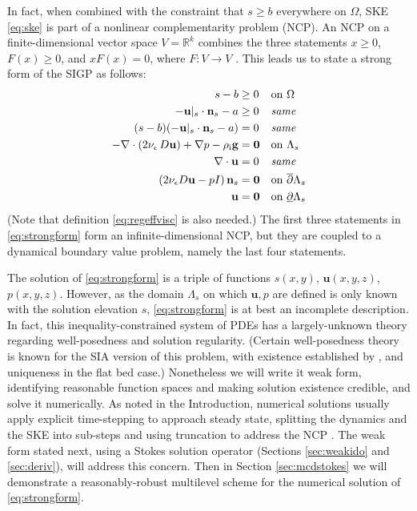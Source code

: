 \documentclass[letterpaper,final,12pt,reqno]{amsart}
\theoremstyle{claim}
\newcommand{\eps}{\epsilon}
\newcommand{\RR}{\mathbb{R}}
\newcommand{\bn}{\mathbf{n}}
\newcommand{\bu}{\mathbf{u}}
\newcommand{\bzero}{\bm{0}}
\newcommand{\rhoi}{\rho_{\text{i}}}
\numberwithin{equation}{section}
\numberwithin{figure}{section}
\numberwithin{table}{section}
\numberwithin{theorem}{section}
\begin{document}
In fact, when combined with the constraint that $s\ge b$ everywhere on $\Omega$, SKE \eqref{eq:ske} is part of a nonlinear complementarity problem (NCP).  An NCP on a finite-dimensional vector space $V=\RR^k$ combines the three statements $x\ge 0$, $F(x)\ge 0$, and $x F(x)=0$, where $F:V\to V$ \cite{FacchineiPang2003}.  This leads us to state a strong form of the SIGP as follows:
\begin{align}
s - b &\ge 0 && \text{on $\Omega$} \label{eq:strongform} \\
- \bu|_s \cdot \bn_s - a &\ge 0 && \text{\emph{same}} \notag \\
(s - b) (- \bu|_s \cdot \bn_s - a) &= 0 && \text{\emph{same}} \notag \\
- \nabla \cdot \left(2 \nu_\eps\, D\bu\right) + \nabla p - \rhoi \mathbf{g} &= \bzero && \text{on $\Lambda_s$} \notag \\
\nabla \cdot \bu &= 0 && \text{\emph{same}} \notag \\
\left(2 \nu_\eps D\bu - pI\right) \bn_s &= \bzero && \text{on $\overline{\partial} \Lambda_s$} \notag \\
\bu &= \bzero && \text{on $\underline{\partial} \Lambda_s$} \notag
\end{align}
(Note that definition \eqref{eq:regeffvisc} is also needed.)  The first three statements in \eqref{eq:strongform} form an infinite-dimensional NCP, but they are coupled to a dynamical boundary value problem, namely the last four statements.

The solution of \eqref{eq:strongform} is a triple of functions $s(x,y)$, $\bu(x,y,z)$, $p(x,y,z)$.  However, as the domain $\Lambda_s$ on which $\bu,p$ are defined is only known with the solution elevation $s$, \eqref{eq:strongform} is at best an incomplete description.  In fact, this inequality-constrained system of PDEs has a largely-unknown theory regarding well-posedness and solution regularity.  (Certain well-posedness theory is known for the SIA version of this problem, with existence established by \cite{JouvetBueler2012}, and uniqueness in the flat bed case.)  Nonetheless we will write it weak form, identifying reasonable function spaces and making solution existence credible, and solve it numerically.  As noted in the Introduction, numerical solutions usually apply explicit time-stepping to approach steady state, splitting the dynamics and the SKE into sub-steps and using truncation to address the NCP \cite[for example]{Jouvetetal2008,Lengetal2012}.  The weak form stated next, using a Stokes solution operator (Sections \ref{sec:weakido} and \ref{sec:deriv}), will address this concern.  Then in Section \ref{sec:mcdstokes} we will demonstrate a reasonably-robust multilevel scheme for the numerical solution of \eqref{eq:strongform}.
\end{document}
